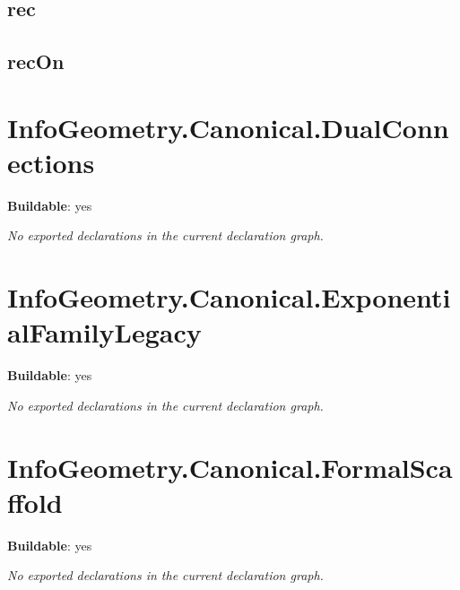 \begin{theorem}[blueprint="infogeometry:canonical:drazin:isdrazininverse:projection_is_idempotent"]
\end{theorem}

\subsection*{rec}

\begin{theorem}[blueprint="infogeometry:canonical:drazin:isdrazininverse:rec"]
\end{theorem}

\subsection*{recOn}

\begin{theorem}[blueprint="infogeometry:canonical:drazin:isdrazininverse:recon"]
\end{theorem}

\section{InfoGeometry.Canonical.DualConnections}

\noindent\textbf{Buildable}: yes

\noindent\emph{No exported declarations in the current declaration graph.}

\section{InfoGeometry.Canonical.ExponentialFamilyLegacy}

\noindent\textbf{Buildable}: yes

\noindent\emph{No exported declarations in the current declaration graph.}

\section{InfoGeometry.Canonical.FormalScaffold}

\noindent\textbf{Buildable}: yes

\noindent\emph{No exported declarations in the current declaration graph.}


